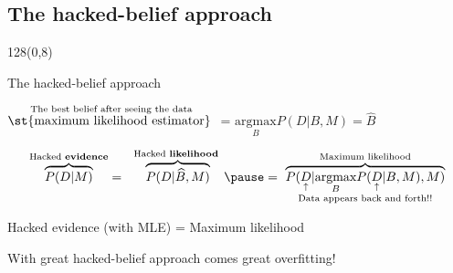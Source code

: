 \documentclass[shownotes]{beamer}
\begin{document}
\subsection{The hacked-belief approach}


\begin{frame}
 \begin{textblock}{128}(0,8)
\begin{center}
 \large The hacked-belief approach
\end{center}
\end{textblock}
\vspace{0.5cm}

\begin{center}
 \centering  $ \overset{\text{The best belief after seeing the data}}{\text{\st{maximum likelihood estimator} }}$ = $\underset{B }{\text{argmax}} P(D|B,M) = \widehat{B}$  
\end{center}


\pause

 \begin{equation*}
\overbrace{P(D|M)}^{\text{\scriptsize Hacked \textbf{evidence}}} = \ \ \overbrace{P(D|\widehat{B},M)}^{\text{\scriptsize Hacked \textbf{likelihood} }} \pause  = \  \underset{\text{Data appears back and forth!!}}{\overbrace{P(\underset{\uparrow}{D}|\underset{B}{\text{argmax}} P(\underset{\uparrow}{D}|B,M), M)}^{\text{\scriptsize Maximum likelihood}}}
\end{equation*}


\pause

\vspace{0.3cm}

\begin{mdframed}[backgroundcolor=black!15]
\centering
 \large Hacked evidence (with MLE) = Maximum likelihood
\end{mdframed}

\pause

\vspace{0.3cm}
\begin{center}
 \centering \large With great hacked-belief approach comes great overfitting!  
\end{center}
  
 
\end{frame}
\end{document}
